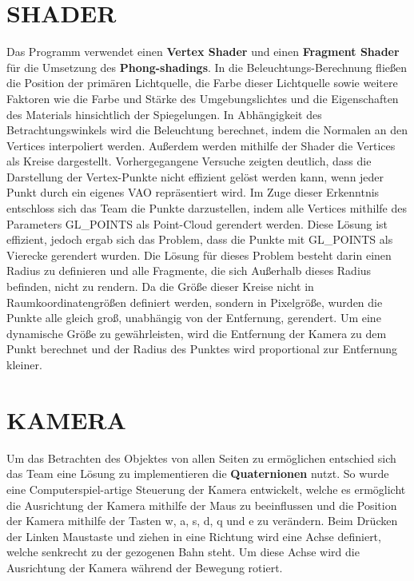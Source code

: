 \section{\Large SHADER}
Das Programm verwendet einen \textbf{Vertex Shader} und einen \textbf{Fragment Shader} für die Umsetzung des \textbf{Phong-shadings}. In die Beleuchtungs-Berechnung fließen die Position der primären Lichtquelle, die Farbe dieser Lichtquelle sowie weitere Faktoren wie die Farbe und Stärke des Umgebungslichtes und die Eigenschaften des Materials hinsichtlich der Spiegelungen. In Abhängigkeit des Betrachtungswinkels wird die Beleuchtung berechnet, indem die Normalen an den Vertices interpoliert werden. Außerdem werden mithilfe der Shader die Vertices als Kreise dargestellt.\newline\newline
Vorhergegangene Versuche zeigten deutlich, dass die Darstellung der Vertex-Punkte nicht effizient gelöst werden kann, wenn jeder Punkt durch ein eigenes VAO repräsentiert wird. Im Zuge dieser Erkenntnis entschloss sich das Team die Punkte darzustellen, indem alle Vertices mithilfe des Parameters GL\_POINTS als Point-Cloud gerendert werden. Diese Lösung ist effizient, jedoch ergab sich das Problem, dass die Punkte mit GL\_POINTS als Vierecke gerendert wurden. Die Lösung für dieses Problem besteht darin einen Radius zu definieren und alle Fragmente, die sich Außerhalb dieses Radius befinden, nicht zu rendern. Da die Größe dieser Kreise nicht in Raumkoordinatengrößen definiert werden, sondern in Pixelgröße, wurden die Punkte alle gleich groß, unabhängig von der Entfernung, gerendert. Um eine dynamische Größe zu gewährleisten, wird die Entfernung der Kamera zu dem Punkt berechnet und der Radius des Punktes wird proportional zur Entfernung kleiner.

\section{\Large KAMERA}
Um das Betrachten des Objektes von allen Seiten zu ermöglichen entschied sich das Team eine Lösung zu implementieren die \textbf{Quaternionen} nutzt. So wurde eine Computerspiel-artige Steuerung der Kamera entwickelt, welche es ermöglicht die Ausrichtung der Kamera mithilfe der Maus zu beeinflussen und die Position der Kamera mithilfe der Tasten w, a, s, d, q und e zu verändern. Beim Drücken der Linken Maustaste und ziehen in eine Richtung wird eine Achse definiert, welche senkrecht zu der gezogenen Bahn steht. Um diese Achse wird die Ausrichtung der Kamera während der Bewegung rotiert.


